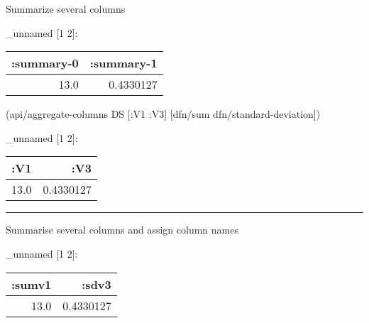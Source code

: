 \documentclass[]{article}
\newenvironment{Shaded}{\begin{snugshade}}{\end{snugshade}}
\newcommand{\VariableTok}[1]{\textcolor[rgb]{0.00,0.00,0.00}{#1}}
\newcommand{\AttributeTok}[1]{\textcolor[rgb]{0.77,0.63,0.00}{#1}}
\newcommand{\NormalTok}[1]{#1}
\begin{document}
Summarize several columns

\begin{Shaded}
\end{Shaded}

\_unnamed {[}1 2{]}:

\begin{longtable}[]{@{}rr@{}}
\toprule
:summary-0 & :summary-1\tabularnewline
\midrule
\endhead
13.0 & 0.4330127\tabularnewline
\bottomrule
\end{longtable}

\begin{Shaded}
\begin{Highlighting}[]
\NormalTok{(api/aggregate-columns DS [}\AttributeTok{:V1} \AttributeTok{:V3}\NormalTok{] [dfn/sum}
\NormalTok{                                     dfn/standard-deviation])}
\end{Highlighting}
\end{Shaded}

\_unnamed {[}1 2{]}:

\begin{longtable}[]{@{}rr@{}}
\toprule
:V1 & :V3\tabularnewline
\midrule
\endhead
13.0 & 0.4330127\tabularnewline
\bottomrule
\end{longtable}

\begin{center}\rule{0.5\linewidth}{0.5pt}\end{center}

Summarise several columns and assign column names

\begin{Shaded}
\end{Shaded}

\_unnamed {[}1 2{]}:

\begin{longtable}[]{@{}rr@{}}
\toprule
:sumv1 & :sdv3\tabularnewline
\midrule
\endhead
13.0 & 0.4330127\tabularnewline
\bottomrule
\end{longtable}
\end{document}
